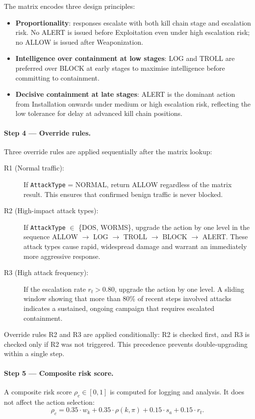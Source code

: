The matrix encodes three design principles:
%
\begin{itemize}
  \item \textbf{Proportionality}: responses escalate with both kill chain
        stage and escalation risk. No ALERT is issued before Exploitation
        even under high escalation risk; no ALLOW is issued after
        Weaponization.
  \item \textbf{Intelligence over containment at low stages}: LOG and TROLL
        are preferred over BLOCK at early stages to maximise intelligence
        before committing to containment.
  \item \textbf{Decisive containment at late stages}: ALERT is the
        dominant action from Installation onwards under medium or high
        escalation risk, reflecting the low tolerance for delay at advanced
        kill chain positions.
\end{itemize}

\paragraph{Step 4 — Override rules.}
Three override rules are applied sequentially after the matrix lookup:
%
\begin{description}
  \item[R1 (Normal traffic):]
        If \texttt{AttackType} = NORMAL, return ALLOW regardless of
        the matrix result.
        This ensures that confirmed benign traffic is never blocked.
  \item[R2 (High-impact attack types):]
        If \texttt{AttackType} $\in$ \{DOS, WORMS\}, upgrade the action
        by one level in the sequence
        ALLOW $\to$ LOG $\to$ TROLL $\to$ BLOCK $\to$ ALERT.
        These attack types cause rapid, widespread damage and warrant
        an immediately more aggressive response.
  \item[R3 (High attack frequency):]
        If the escalation rate $r_t > 0.80$, upgrade the action by one
        level.
        A sliding window showing that more than 80\% of recent steps
        involved attacks indicates a sustained, ongoing campaign that
        requires escalated containment.
\end{description}

Override rules R2 and R3 are applied conditionally: R2 is checked first,
and R3 is checked only if R2 was not triggered.
This precedence prevents double-upgrading within a single step.

\paragraph{Step 5 — Composite risk score.}
A composite risk score $\rho_c \in [0, 1]$ is computed for logging and
analysis.
It does not affect the action selection:
%
\begin{equation}
  \rho_c = 0.35 \cdot w_k
         + 0.35 \cdot \rho(k, \pi)
         + 0.15 \cdot s_a
         + 0.15 \cdot r_t.
  \label{eq:composite_risk}
\end{equation}

